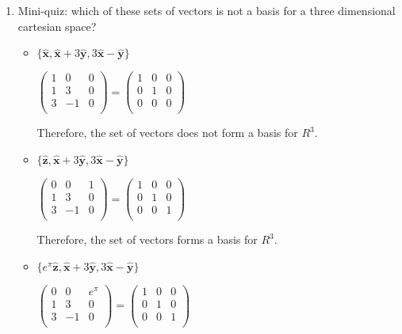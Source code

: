 \documentclass[fleqn]{article}
\begin{document}
\begin{enumerate}
\item Mini-quiz: which of these sets of vectors is not a basis for a three dimensional cartesian space? 
\begin{itemize}
\item $\{ \mathbf{\hat{x}}, \mathbf{\hat{x}}+3\mathbf{\hat{y}}, 3\mathbf{\hat{x}}-\mathbf{\hat{y}} \}$

\noindent
$\displaystyle
  \begin{pmatrix}
    1 & 0 & 0 \\
    1 & 3 & 0 \\ 
    3 & -1 & 0 \\ 
  \end{pmatrix}
  =
  \begin{pmatrix}
    1 & 0 & 0 \\
    0 & 1 & 0 \\ 
    0 & 0 & 0 \\ 
  \end{pmatrix}
$

Therefore, the set of vectors does not form a basis for $R^3$.


\item $\{ \mathbf{\hat{z}}, \mathbf{\hat{x}}+3\mathbf{\hat{y}}, 3\mathbf{\hat{x}}-\mathbf{\hat{y}}\}$

\noindent
$\displaystyle
  \begin{pmatrix}
    0 & 0 & 1 \\
    1 & 3 & 0 \\ 
    3 & -1 & 0 \\ 
  \end{pmatrix}
  =
  \begin{pmatrix}
    1 & 0 & 0 \\
    0 & 1 & 0 \\ 
    0 & 0 & 1 \\ 
  \end{pmatrix}
$

Therefore, the set of vectors forms a basis for $R^3$.

\item $\{ e^\pi \mathbf{\hat{z}}, \mathbf{\hat{x}}+3\mathbf{\hat{y}}, 3\mathbf{\hat{x}}-\mathbf{\hat{y}}\}$

\noindent
$\displaystyle
  \begin{pmatrix}
    0 & 0 & e^\pi \\
    1 & 3 & 0 \\ 
    3 & -1 & 0 \\ 
  \end{pmatrix}
  =
  \begin{pmatrix}
    1 & 0 & 0 \\
    0 & 1 & 0 \\ 
    0 & 0 & 1 \\ 
  \end{pmatrix}
$


\end{itemize}
\end{enumerate}
\end{document}
